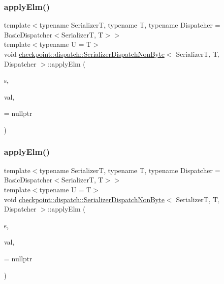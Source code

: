 \subsubsection{\texorpdfstring{apply\+Elm()}{applyElm()}\hspace{0.1cm}{\footnotesize\ttfamily [1/3]}}
{\footnotesize\ttfamily template$<$typename SerializerT, typename T, typename Dispatcher = Basic\+Dispatcher$<$\+Serializer\+T, T$>$$>$ \\
template$<$typename U  = T$>$ \\
void \hyperlink{structcheckpoint_1_1dispatch_1_1_serializer_dispatch_non_byte}{checkpoint\+::dispatch\+::\+Serializer\+Dispatch\+Non\+Byte}$<$ SerializerT, T, Dispatcher $>$\+::apply\+Elm (\begin{DoxyParamCaption}\item[{SerializerT \&}]{s,  }\item[{T $\ast$}]{val,  }\item[{has\+Split\+Serialize$<$ U $>$ $\ast$}]{ = {\ttfamily nullptr} }\end{DoxyParamCaption})\hspace{0.3cm}{\ttfamily [inline]}}

\mbox{\label{structcheckpoint_1_1dispatch_1_1_serializer_dispatch_non_byte_a88fe1c00864f170cd59deb25a2bf2695}} 
\subsubsection{\texorpdfstring{apply\+Elm()}{applyElm()}\hspace{0.1cm}{\footnotesize\ttfamily [2/3]}}
{\footnotesize\ttfamily template$<$typename SerializerT, typename T, typename Dispatcher = Basic\+Dispatcher$<$\+Serializer\+T, T$>$$>$ \\
template$<$typename U  = T$>$ \\
void \hyperlink{structcheckpoint_1_1dispatch_1_1_serializer_dispatch_non_byte}{checkpoint\+::dispatch\+::\+Serializer\+Dispatch\+Non\+Byte}$<$ SerializerT, T, Dispatcher $>$\+::apply\+Elm (\begin{DoxyParamCaption}\item[{SerializerT \&}]{s,  }\item[{T $\ast$}]{val,  }\item[{has\+Not\+Split\+Serialize$<$ U $>$ $\ast$}]{ = {\ttfamily nullptr} }\end{DoxyParamCaption})\hspace{0.3cm}{\ttfamily [inline]}}

